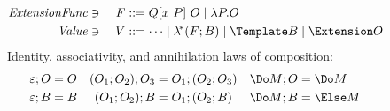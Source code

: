 \begin{figure}[t!]
\centering
\small
\begin{alignat*}{2}
  \mathit{ExtensionFunc} &\ni{}& F
  &::= Q[x ~ P] ~ O
  \mid \lambda P. O
  \\
  \mathit{Value} &\ni{}& V
  &::= \dots
  \mid \lamstar (F; B)
  \mid \Template B
  \mid \Extension O
\end{alignat*}
Identity, associativity, and annihilation laws of composition:
\begin{align*}
  \varepsilon; O &= O %
  &
  (O_1; O_2); O_3 &= O_1; (O_2; O_3)
  &
  \Do M; O &= \Do M
  \\
  \varepsilon; B &= B
  &
  (O_1; O_2); B &= O_1; (O_2; B)
  &
  \Do M; B &= \Else M
\end{align*}




\end{figure}

